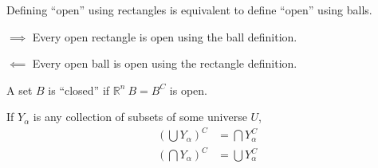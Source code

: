 \documentclass[a4paper]{article}
\numberwithin{equation}{section}
\newcommand{\R}{\mathbb{R}}
\begin{document}
\begin{theorem}
    Defining ``open'' using rectangles is equivalent to define ``open'' using balls.
    \begin{prooof}
        $\implies$ Every open rectangle is open using the ball definition.
        
        $\impliedby$ Every open ball is open using the rectangle definition.
    \end{prooof}
\end{theorem}

\begin{definition}
    A set $B$ is ``closed'' if $\R^n \ B=B^C$ is open. 
\end{definition}

\begin{proposition}
   
    If $Y_\alpha$ is any collection of subsets of some universe $U$,
    \begin{align}
        \left(\bigcup Y_\alpha\right)^C&=\bigcap Y_\alpha^C\\
        \left(\bigcap Y_\alpha\right)^C&=\bigcup Y_\alpha^C
    \end{align}
\end{proposition}
\end{document}
